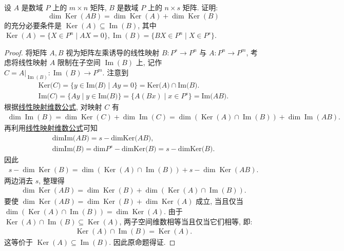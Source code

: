 \documentclass[../../main.tex]{subfiles}%
\begin{document}
\begin{example}
设 \(A\) 是数域 \(P\) 上的 \(m \times n\) 矩阵, \(B\) 是数域 \(P\) 上的 \(n \times s\) 矩阵. 证明: 
\[\dim \operatorname{Ker} (AB) = \dim \operatorname{Ker} (A) + \dim \operatorname{Ker} (B)\]
的充分必要条件是 \(\operatorname{Ker} (A) \subseteq \operatorname{Im} (B)\), 其中 \(\operatorname{Ker} (A) = \{X \in P^n \mid AX = 0\}, \operatorname{Im} (B) = \{BX \in P^n \mid X \in P^s\}.\)
\end{example}
\begin{proof}
将矩阵 \(A, B\) 视为矩阵左乘诱导的线性映射 \(B:P^s \to P^n\) 与 \(A:P^n \to P^m\), 考虑将线性映射 \(A\) 限制在子空间 \(\operatorname{Im}(B)\) 上, 记作 \(C = A|_{\operatorname{Im}(B)}: \operatorname{Im}(B) \to P^m.\)
注意到
\begin{gather*}
\mathrm{Ker(}C)=\{y\in \mathrm{Im(}B)\mid Ay=0\}=\mathrm{Ker(}A)\cap \mathrm{Im(}B).
\\
\mathrm{Im(}C)=\{Ay\mid y\in \mathrm{Im(}B)\}=\{A(Bx)\mid x\in P^s\}=\mathrm{Im(}AB).
\end{gather*}
根据\hyperref[theorem:线性映射的维数公式]{线性映射维数公式}, 对映射 \(C\) 有
\begin{align*}
\dim \operatorname{Im}(B) = \dim \operatorname{Ker}(C) + \dim \operatorname{Im}(C) = \dim (\operatorname{Ker}(A) \cap \operatorname{Im}(B)) + \dim \operatorname{Im}(AB).
\end{align*}
再利用\hyperref[theorem:线性映射的维数公式]{线性映射维数公式}可知 
\begin{gather*}
\mathrm{dimIm(}AB)=s-\mathrm{dimKer(}AB),
\\
\mathrm{dimIm(}B)=\mathrm{dim}P^s-\mathrm{dimKer(}B)=s-\mathrm{dimKer(}B).
\end{gather*}
因此
\begin{align*}
s - \dim \operatorname{Ker}(B) = \dim (\operatorname{Ker}(A) \cap \operatorname{Im}(B)) + s - \dim \operatorname{Ker}(AB).
\end{align*}
两边消去 \(s\), 整理得
\begin{align*}
\dim \operatorname{Ker}(AB) = \dim \operatorname{Ker}(B) + \dim (\operatorname{Ker}(A) \cap \operatorname{Im}(B)).
\end{align*}
要使 \(\dim \operatorname{Ker}(AB) = \dim \operatorname{Ker}(B) + \dim \operatorname{Ker}(A)\) 成立, 当且仅当 \(\dim (\operatorname{Ker}(A) \cap \operatorname{Im}(B)) = \dim \operatorname{Ker}(A).\)
由于 \(\operatorname{Ker}(A) \cap \operatorname{Im}(B) \subseteq \operatorname{Ker}(A)\), 两子空间维数相等当且仅当它们相等, 即:
\begin{align*}
\operatorname{Ker}(A) \cap \operatorname{Im}(B) = \operatorname{Ker}(A).
\end{align*}
这等价于 \(\operatorname{Ker}(A) \subseteq \operatorname{Im}(B).\)
因此原命题得证.
\end{proof}
\end{document}
